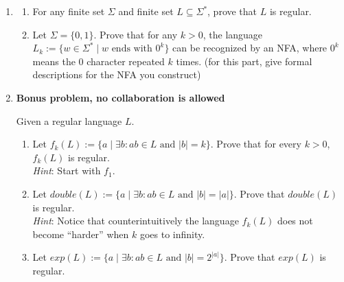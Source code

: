 \documentclass[letterpaper,11pt]{article}
\begin{document}
\begin{enumerate}
\item\label{last}
  \begin{enumerate}
    \item For any finite set $\Sigma$ and finite set $L \subseteq \Sigma^*$, prove that $L$ is regular.
    \item Let $\Sigma = \{0, 1\}$. Prove that for any $k > 0$, the language $L_k := \{ w \in \Sigma^* \mid w\text{ ends with } 0^k\}$ can be recognized by an NFA, where $0^k$ means the 0 character repeated $k$ times. (for this part, give formal descriptions for the NFA you construct)
  \end{enumerate}

\item
	\textbf{Bonus problem, no collaboration is allowed}
	
  Given a regular language $L$.
  \begin{enumerate}
    \item Let $f_k(L) := \{a \mid \exists b : ab \in L\text{ and } |b| = k\}$. Prove that for every $k > 0$, $f_k(L)$ is regular. \\
      \emph{Hint}: Start with $f_1$.
    \item Let $double(L) := \{a \mid \exists b : ab \in L\text{ and } |b| = |a|\}$. Prove that $double(L)$ is regular. \\
      \emph{Hint}: Notice that counterintuitively the language $f_k(L)$ does not become ``harder'' when $k$ goes to infinity.
    \item Let $exp(L) := \{a \mid \exists b : ab \in L\text{ and } |b| = 2^{|a|}\}$. Prove that $exp(L)$ is regular.
  \end{enumerate}
\end{enumerate}
\end{document}
